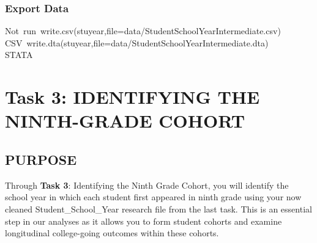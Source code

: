 \documentclass[12pt]{article}
\makeatletter
\newcommand{\hlcomment}[1]{\textcolor[rgb]{0.180392156862745,0.6,0.341176470588235}{#1}}%
\newcommand{\hlstd}[1]{\textcolor[rgb]{0,0,0}{#1}}%
\newenvironment{kframe}{%
 \def\FrameCommand##1{\hskip\@totalleftmargin \hskip-\fboxsep
 \colorbox{shadecolor}{##1}\hskip-\fboxsep
     \hskip-\linewidth \hskip-\@totalleftmargin \hskip\columnwidth}%
 \MakeFramed {\advance\hsize-\width
   \@totalleftmargin\z@ \linewidth\hsize
   \@setminipage}}%
 {\par\unskip\endMakeFramed}
\newenvironment{knitrout}{}{} %
\renewenvironment{knitrout}{\begin{footnotesize}}{\end{footnotesize}}
\makeatother
\begin{document}
\subsubsection{Export Data}

\begin{knitrout}
\color{fgcolor}\begin{kframe}
\begin{flushleft}
\ttfamily\noindent
\hlcomment{\usebox{\hlnormalsizeboxhash}{\ }Not{\ }run{\ }write.csv(stuyear,file=\usebox{\hlnormalsizeboxsinglequote}data/Student\usebox{\hlnormalsizeboxunderscore}School\usebox{\hlnormalsizeboxunderscore}Year\usebox{\hlnormalsizeboxunderscore}Intermediate.csv\usebox{\hlnormalsizeboxsinglequote}){\ }\usebox{\hlnormalsizeboxhash}}\hspace*{\fill}\\
\hlstd{}\hlcomment{\usebox{\hlnormalsizeboxhash}{\ }CSV{\ }write.dta(stuyear,file=\usebox{\hlnormalsizeboxsinglequote}data/Student\usebox{\hlnormalsizeboxunderscore}School\usebox{\hlnormalsizeboxunderscore}Year\usebox{\hlnormalsizeboxunderscore}Intermediate.dta\usebox{\hlnormalsizeboxsinglequote}){\ }\usebox{\hlnormalsizeboxhash}}\hspace*{\fill}\\
\hlstd{}\hlcomment{\usebox{\hlnormalsizeboxhash}{\ }STATA}\mbox{}
\normalfont
\end{flushleft}
\end{kframe}
\end{knitrout}



\section{Task 3: IDENTIFYING THE NINTH-GRADE COHORT}
\subsection{PURPOSE}
Through \textbf{Task 3}: Identifying the Ninth Grade Cohort, you will identify the school year in which each student first appeared in ninth 
grade using your now cleaned Student_School_Year research file from the last task. This is an essential step in our analyses as it 
allows you to form student cohorts and examine longitudinal college-going outcomes within these cohorts.\\
\end{document}
